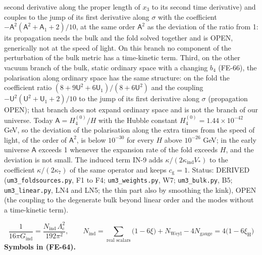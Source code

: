 \documentclass[
  10pt,
]{article}
\begin{document}
second derivative along the proper length of \(x_3\) to its second time
derivative) and couples to the jump of its first derivative along
\(\sigma\) with the coefficient
\(-\mathsf{A}^2(\mathsf{A}^2 + \mathsf{A}_1 + 2)/10\), at the same order
\(\mathsf{A}^2\) as the deviation of the ratio from 1: its propagation
needs the bulk and the fold solved together and is OPEN, generically not
at the speed of light. On this branch no component of the perturbation
of the bulk metric has a time-kinetic term. Third, on the other vacuum
branch of the bulk, static ordinary space with a changing \(b_4\)
(FE-66), the polarisation along ordinary space has the same structure:
on the fold the coefficient ratio
\((8 + 9\mathsf{U}^2 + 6\mathsf{U}_1)/(8 + 6\mathsf{U}^2)\) and the
coupling \(-\mathsf{U}^2(\mathsf{U}^2 + \mathsf{U}_1 + 2)/10\) to the
jump of its first derivative along \(\sigma\) (propagation OPEN); that
branch does not expand ordinary space and is not the branch of our
universe. Today \(\mathsf{A} = H_4^{(0)}/H\) with the Hubble constant
\(H_4^{(0)} = 1.44\times10^{-42}\) GeV, so the deviation of the
polarisation along the extra times from the speed of light, of the order
of \(\mathsf{A}^2\), is below \(10^{-30}\) for every \(H\) above
\(10^{-26}\) GeV; in the early universe \(\mathsf{A}\) exceeds 1
whenever the expansion rate of the fold exceeds \(H\), and the deviation
is not small. The induced term IN-9 adds
\(\kappa/(2\kappa_{\mathrm{ind}}V_*)\) to the coefficient
\(\kappa/(2\kappa_7)\) of the same operator and keeps
\(c_{\mathrm{g}} = 1\). Status: DERIVED (\texttt{um3\_foldsources.py},
F1 to F4; \texttt{um3\_weights.py}, W7; \texttt{um3\_bulk.py}, B5;
\texttt{um3\_linear.py}, LN4 and LN5; the thin part also by smoothing
the kink), OPEN (the coupling to the degenerate bulk beyond linear order
and the modes without a time-kinetic term).

\[
\frac{1}{16\pi G_{\mathrm{ind}}} = \frac{N_{\mathrm{ind}}\,\Lambda_{\mathrm{c}}^2}{192\pi^2},\qquad
N_{\mathrm{ind}} = \sum_{\text{real scalars}}\big(1 - 6\xi\big) + N_{\mathrm{Weyl}} - 4N_{\mathrm{gauge}} = 4\big(1 - 6\xi_{\mathrm{H}}\big) \tag{FE-64}
\] \textbf{Symbols in (FE-64).}
\end{document}
